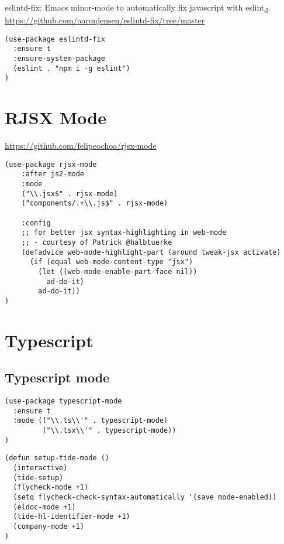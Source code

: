 \documentclass[11pt]{article}
\begin{document}
eslintd-fix: Emacs minor-mode to automatically fix javascript with eslint\textsubscript{d}.
\url{https://github.com/aaronjensen/eslintd-fix/tree/master}

\begin{verbatim}
(use-package eslintd-fix
  :ensure t
  :ensure-system-package
  (eslint . "npm i -g eslint")
)
\end{verbatim}

\section*{RJSX Mode}
\label{sec:org4f019e6}

\url{https://github.com/felipeochoa/rjsx-mode}

\begin{verbatim}
(use-package rjsx-mode
    :after js2-mode
    :mode
    ("\\.jsx$" . rjsx-mode)
    ("components/.+\\.js$" . rjsx-mode)

    :config
    ;; for better jsx syntax-highlighting in web-mode
    ;; - courtesy of Patrick @halbtuerke
    (defadvice web-mode-highlight-part (around tweak-jsx activate)
      (if (equal web-mode-content-type "jsx")
        (let ((web-mode-enable-part-face nil))
          ad-do-it)
        ad-do-it))
)
\end{verbatim}


\section*{Typescript}
\label{sec:orgfe05516}

\subsection*{Typescript mode}
\label{sec:org0df4302}

\begin{verbatim}
(use-package typescript-mode
  :ensure t
  :mode (("\\.ts\\'" . typescript-mode)
         ("\\.tsx\\'" . typescript-mode))
)
\end{verbatim}

\begin{verbatim}
(defun setup-tide-mode ()
  (interactive)
  (tide-setup)
  (flycheck-mode +1)
  (setq flycheck-check-syntax-automatically '(save mode-enabled))
  (eldoc-mode +1)
  (tide-hl-identifier-mode +1)
  (company-mode +1)
)
\end{verbatim}
\end{document}
